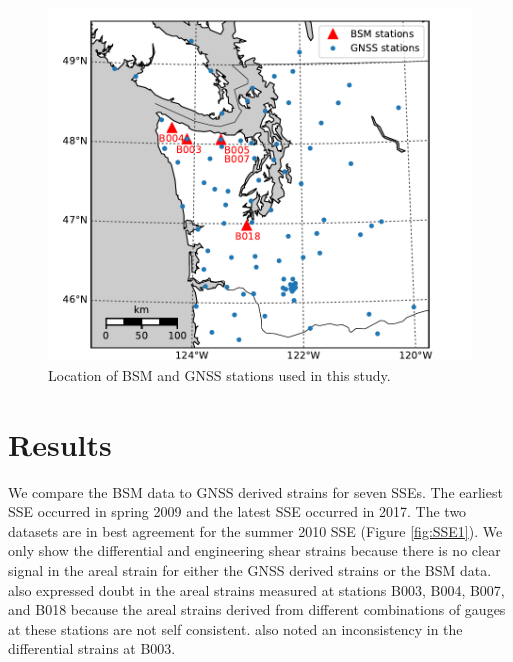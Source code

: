 \documentclass[10pt,a4paper]{article}
\begin{document}
\begin{figure}
\includegraphics{figures/map.pdf}
\caption{Location of BSM and GNSS stations used in this study.}   
\label{fig:Map}
\end{figure}

\section{Results}
We compare the BSM data to GNSS derived strains for seven SSEs. The earliest SSE occurred in spring 2009 and the latest SSE occurred in 2017. The two datasets are in best agreement for the summer 2010 SSE (Figure \ref{fig:SSE1}). We only show the differential and engineering shear strains because there is no clear signal in the areal strain for either the GNSS derived strains or the BSM data. \citet{Roeloffs2010} also expressed doubt in the areal strains measured at stations B003, B004, B007, and B018 because the areal strains derived from different combinations of gauges at these stations are not self consistent. \citet{Roeloffs2010} also noted an inconsistency in the differential strains at B003. 
\end{document}
